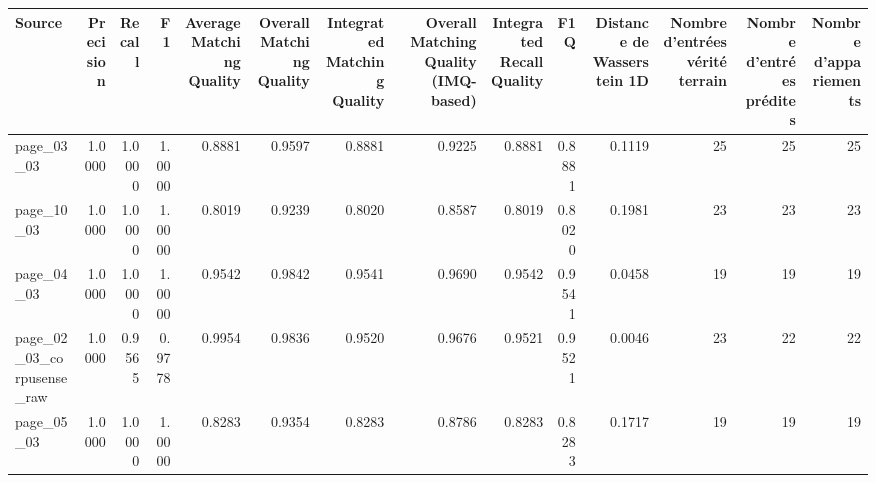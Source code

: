\begin{tabular}{lrrrrrrrrrrrrr}
\toprule
Source & Precision & Recall & F1 & Average Matching Quality & Overall Matching Quality & Integrated Matching Quality & Overall Matching Quality (IMQ-based) & Integrated Recall Quality & F1Q & Distance de Wasserstein 1D & Nombre d'entrées vérité terrain & Nombre d'entrées prédites & Nombre d'appariements \\
\midrule
page\_03\_03 & 1.0000 & 1.0000 & 1.0000 & 0.8881 & 0.9597 & 0.8881 & 0.9225 & 0.8881 & 0.8881 & 0.1119 & 25 & 25 & 25 \\
page\_10\_03 & 1.0000 & 1.0000 & 1.0000 & 0.8019 & 0.9239 & 0.8020 & 0.8587 & 0.8019 & 0.8020 & 0.1981 & 23 & 23 & 23 \\
page\_04\_03 & 1.0000 & 1.0000 & 1.0000 & 0.9542 & 0.9842 & 0.9541 & 0.9690 & 0.9542 & 0.9541 & 0.0458 & 19 & 19 & 19 \\
page\_02\_03\_corpusense\_raw & 1.0000 & 0.9565 & 0.9778 & 0.9954 & 0.9836 & 0.9520 & 0.9676 & 0.9521 & 0.9521 & 0.0046 & 23 & 22 & 22 \\
page\_05\_03 & 1.0000 & 1.0000 & 1.0000 & 0.8283 & 0.9354 & 0.8283 & 0.8786 & 0.8283 & 0.8283 & 0.1717 & 19 & 19 & 19 \\
\bottomrule
\end{tabular}
